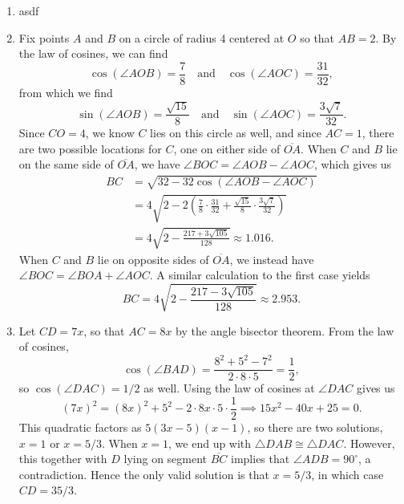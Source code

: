 \begin{enumerate}
\begin{enumerate}
\end{enumerate}
\item asdf
\item Fix points $A$ and $B$ on a circle of radius $4$ centered at $O$ so that $AB = 2$. By the law of cosines, we can find
\begin{equation*}
\cos(\angle AOB) = \frac{7}{8}\quad\text{and}\quad\cos(\angle AOC) = \frac{31}{32},
\end{equation*}
from which we find
\begin{equation*}
\sin(\angle AOB) = \frac{\sqrt{15}}{8}\quad\text{and}\quad\sin(\angle AOC) = \frac{3\sqrt{7}}{32}.
\end{equation*}
Since $CO = 4$, we know $C$ lies on this circle as well, and since $AC = 1$, there are two possible locations for $C$, one on either side of $\overline{OA}$. When $C$ and $B$ lie on the same side of $\overline{OA}$, we have $\angle BOC = \angle AOB - \angle AOC$, which gives us
\begin{align*}
BC &= \sqrt{32 - 32\cos(\angle AOB - \angle AOC)} \\
&= 4\sqrt{2 - 2\left(\frac{7}{8}\cdot\frac{31}{32} + \frac{\sqrt{15}}{8}\cdot\frac{3\sqrt{7}}{32}\right)} \\
&= 4\sqrt{2 - \frac{217 + 3\sqrt{105}}{128}}\approx 1.016.
\end{align*}
When $C$ and $B$ lie on opposite sides of $\overline{OA}$, we instead have $\angle BOC = \angle BOA + \angle AOC$. A similar calculation to the first case yields
\begin{equation*}
BC = 4\sqrt{2 - \frac{217 - 3\sqrt{105}}{128}}\approx 2.953.
\end{equation*}
\item Let $CD = 7x$, so that $AC = 8x$ by the angle bisector theorem. From the law of cosines,
\begin{equation*}
\cos(\angle BAD) = \frac{8^2 + 5^2 - 7^2}{2\cdot 8\cdot 5} = \frac{1}{2},
\end{equation*}
so $\cos(\angle DAC) = 1/2$ as well. Using the law of cosines at $\angle DAC$ gives us
\begin{equation*}
(7x)^2 = (8x)^2 + 5^2 - 2\cdot 8x\cdot 5\cdot\frac{1}{2}\implies 15x^2 - 40x + 25 = 0.
\end{equation*}
This quadratic factors as $5(3x - 5)(x - 1)$, so there are two solutions, $x = 1$ or $x = 5/3$. When $x = 1$, we end up with $\triangle DAB\cong\triangle DAC$. However, this together with $D$ lying on segment $\overline{BC}$ implies that $\angle ADB = 90^{\circ}$, a contradiction. Hence the only valid solution is that $x = 5/3$, in which case $CD = 35/3$.

\end{enumerate}
